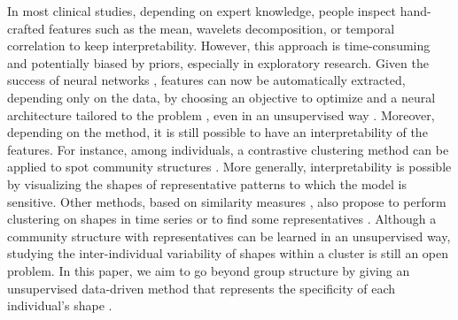   In most clinical studies, depending on expert knowledge, people inspect hand-crafted features such as the mean, wavelets decomposition, or temporal correlation \cite{anderson2011statistical} to keep interpretability.
   However, this approach is time-consuming and potentially biased by priors, especially in exploratory research.
   Given the success of neural networks \cite{bishop1994neural}, features can now be automatically extracted, depending only on the data, by choosing an objective to optimize and a neural architecture tailored to the problem \cite{ismail2019deep,blazquez2021review,torres2021deep}, even in an unsupervised way \cite{meng2023unsupervised}.
   Moreover, depending on the method, it is still possible to have an interpretability of the features.
    For instance, among individuals, a contrastive clustering method can be applied to spot community structures \cite{franceschi2019unsupervised,tonekaboni2021unsupervised,meng2023unsupervised}.
    More generally, interpretability \cite{yuan2019wave2vec,zhang2018visual,ismail2020benchmarking} is possible by visualizing the shapes of representative patterns to which the model is sensitive.
    Other methods, based on similarity measures \cite{asgari2023clustering,germain2023unsupervised,paparrizos2015k}, also propose to perform clustering on shapes in time series or to find some representatives \cite{ye2009time}.
    Although a community structure with representatives can be learned in an unsupervised way,
     studying the inter-individual variability of shapes within a cluster \cite{niennattrakul2007inaccuracies,shirato2023identifying} is still an open problem.
     In this paper, we aim to go beyond group structure by giving an unsupervised data-driven method that represents the specificity of each individual's shape \cite{vidal2021perceptual}.%


